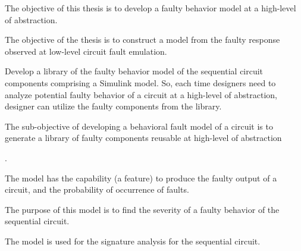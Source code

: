 \begin{itemize}


\item{The objective of this thesis is to develop a faulty behavior model
at a high-level of abstraction. 


\item The objective of the thesis is to construct a model from the faulty response observed at low-level circuit fault emulation.

\item{Develop a library of the faulty behavior model of the sequential circuit
components comprising a Simulink model. So, each time designers need to analyze potential faulty behavior of a circuit at a high-level of abstraction, designer can utilize the faulty components from the library}.

\item The sub-objective of developing a behavioral fault model of a circuit is to generate a library of faulty components reusable at high-level of abstraction}.



\item{The model has the capability (a feature) to produce the faulty output of a circuit, and the probability of occurrence of faults.}

\item The purpose of this model is to find the severity of a faulty behavior of the sequential circuit. 

\item The model is used for the signature analysis for the sequential circuit.







\end{itemize}
